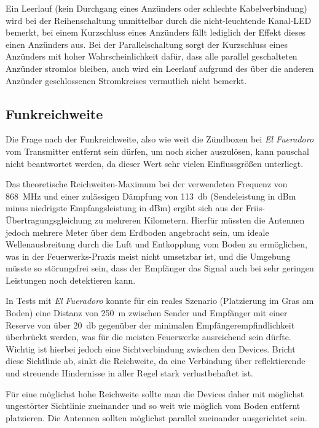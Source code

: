 \documentclass[paper=a4, parskip, numbers=noenddot, toc=listof, headsepline]{scrbook}
\newcommand{\anlage}{\emph{El Fueradoro}}
\begin{document}
				Ein Leerlauf (kein Durchgang eines Anzünders oder schlechte Kabelverbindung) wird bei der Reihenschaltung unmittelbar durch die nicht-leuchtende Kanal-LED bemerkt, bei einem Kurzschluss eines Anzünders fällt lediglich der Effekt dieses einen Anzünders aus. Bei der Parallelschaltung sorgt der Kurzschluss eines Anzünders mit hoher Wahrscheinlichkeit dafür, dass alle parallel geschalteten Anzünder stromlos bleiben, auch wird ein Leerlauf aufgrund des über die anderen Anzünder geschlossenen Stromkreises vermutlich nicht bemerkt.

			\subsection{Funkreichweite}

				Die Frage nach der Funkreichweite, also wie weit die Zündboxen bei {\anlage} vom Transmitter entfernt sein dürfen, um noch sicher auszulösen, kann pauschal nicht beantwortet werden, da dieser Wert sehr vielen Einflussgrößen unterliegt.

				Das theoretische Reichweiten-Maximum bei der verwendeten Frequenz von \SI{868}{\mega\hertz} und einer zulässigen Dämpfung von \SI{113}{\decibel} (Sendeleistung in dBm minus niedrigste Empfangsleistung in dBm) ergibt sich aus der Friis-Übertragungsgleichung zu mehreren Kilometern. Hierfür müssten die Antennen jedoch mehrere Meter über dem Erdboden angebracht sein, um ideale Wellenausbreitung durch die Luft und Entkopplung vom Boden zu ermöglichen, was in der Feuerwerks-Praxis meist nicht umsetzbar ist, und die Umgebung müsste so störungsfrei sein, dass der Empfänger das Signal auch bei sehr geringen Leistungen noch detektieren kann.

				In Tests mit {\anlage} konnte für ein reales Szenario (Platzierung im Gras am Boden) eine Distanz von \SI{250}{\meter} zwischen Sender und Empfänger mit einer Reserve von über \SI{20}{\decibel} gegenüber der minimalen Empfänger\-empfindlichkeit überbrückt werden, was für die meisten Feuerwerke ausreichend sein dürfte. Wichtig ist hierbei jedoch eine Sichtverbindung zwischen den Devices. Bricht diese Sichtlinie ab, sinkt die Reichweite, da eine Verbindung über reflektierende und streuende Hindernisse in aller Regel stark verlustbehaftet ist.

				Für eine möglichst hohe Reichweite sollte man die Devices daher mit möglichst ungestörter Sichtlinie zueinander und so weit wie möglich vom Boden entfernt platzieren. Die Antennen sollten möglichst parallel zueinander ausgerichtet sein.
\end{document}
